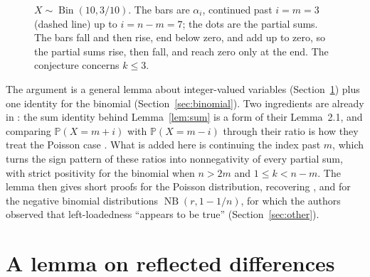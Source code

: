 \documentclass[11pt]{amsart}
\theoremstyle{definition}
\theoremstyle{remark}
\DeclareMathOperator{\Bin}{Bin}
\DeclareMathOperator{\NB}{NB}
\newcommand{\Prob}{\mathbb P}
\begin{document}
\begin{figure}[t]
\centering
{}
\caption{$X\sim\Bin(10,3/10)$. The bars are $\alpha_i$, continued past $i=m=3$ (dashed line) up to $i=n-m=7$; the dots
are the partial sums. The bars fall and then rise, end below zero, and add up to zero, so the partial sums rise, then
fall, and reach zero only at the end. The conjecture concerns $k\le3$.}
\label{fig:alpha}
\end{figure}

The argument is a general lemma about integer-valued variables (Section~\ref{sec:lemma}) plus one identity for the
binomial (Section~\ref{sec:binomial}). Two ingredients are already in \cite{FPP}: the sum identity behind
Lemma~\ref{lem:sum} is a form of their Lemma~2.1, and comparing $\Prob(X=m+i)$ with $\Prob(X=m-i)$ through their ratio
is how they treat the Poisson case \cite[Lemma~3.6]{FPP}. What is added here is continuing the index past $m$, which
turns the sign pattern of these ratios into nonnegativity of every partial sum, with strict positivity for the
binomial when $n>2m$ and $1\le k<n-m$. The lemma then gives short proofs for the
Poisson distribution, recovering \cite[Lemma 3.7]{FPP}, and for the negative binomial distributions $\NB(r,1-1/n)$, for which the authors observed
that left-loadedness ``appears to be true'' \cite[p.~140]{FPP} (Section~\ref{sec:other}).

\section{A lemma on reflected differences}\label{sec:lemma}
\end{document}
